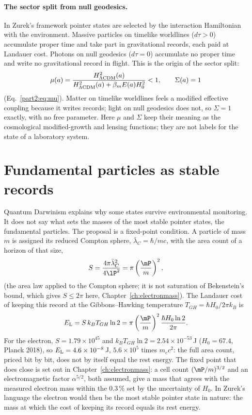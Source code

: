 \paragraph{The sector split from null geodesics.} In Zurek's framework pointer states are selected by the interaction Hamiltonian with the environment.
Massive particles on timelike worldlines ($d\tau>0$) accumulate proper time and take part in gravitational records, each paid at Landauer cost. Photons
on null geodesics ($d\tau=0$) accumulate no proper time and write no gravitational record in flight. This is the origin of the sector split:
\begin{equation}
\mu(a)=\frac{H^2_{\Lambda{\rm CDM}}(a)}{H^2_{\Lambda{\rm CDM}}(a)+\beta_mE(a)H_0^2}<1,\qquad\Sigma(a)=1\label{eq:qr_mu}
\end{equation}
(Eq.~\ref{part2:eq:mu}). \derived{} Matter on timelike worldlines feels a modified effective coupling because it writes records; light on null geodesics
does not, so $\Sigma=1$ exactly, with no free parameter. Here $\mu$ and $\Sigma$ keep their meaning as the cosmological modified-growth and lensing
functions; they are not labels for the state of a laboratory system.

\section{Fundamental particles as stable records}\label{sec:qr_particles}
Quantum Darwinism explains why some states survive environmental monitoring. It does not say what sets the masses of the most stable pointer states, the
fundamental particles. The proposal is a fixed-point condition. A particle of mass $m$ is assigned its reduced Compton sphere, $\bar\lambda_C=\hbar/mc$,
with the area count of a horizon of that size,
\begin{equation}
S=\frac{4\pi\bar\lambda_C^2}{4\lP^2}=\pi\left(\frac{\mP}{m}\right)^2 ,\label{eq:qr_Scompton}
\end{equation}
\conjecture{} (the area law applied to the Compton sphere; it is not saturation of Bekenstein's bound, which gives $S\le2\pi$ here,
Chapter~\ref{ch:electronmass}). The Landauer cost of keeping this record at the Gibbons--Hawking temperature $T_{GH}=\hbar H_0/2\pi k_B$ is
\begin{equation}
E_{\rm L}=S\,k_BT_{GH}\ln2=\pi\left(\frac{\mP}{m}\right)^2\frac{\hbar H_0\ln2}{2\pi}.\label{eq:qr_ELcompton}
\end{equation}
\calc{} For the electron, $S=1.79\times10^{45}$ and $k_BT_{GH}\ln2=2.54\times10^{-53}$\,J ($H_0=67.4$, Planck 2018), so $E_{\rm L}=4.6\times10^{-8}$\,J, $5.6\times10^5$
times $m_ec^2$: the full area count, priced bit by bit, does not by itself equal the rest energy. \calc{} The fixed point that does close is set out in
Chapter~\ref{ch:electronmass}: a cell count $(\mP/m)^{3/2}$ and an electromagnetic factor $\alpha^{5/2}$, both assumed, give a mass that agrees with the
measured electron mass within the $0.3\,\%$ set by the uncertainty of $H_0$. \conjecture{} In Zurek's language the electron would then be the most stable
pointer state in nature: the mass at which the cost of keeping its record equals its rest energy. \interp

